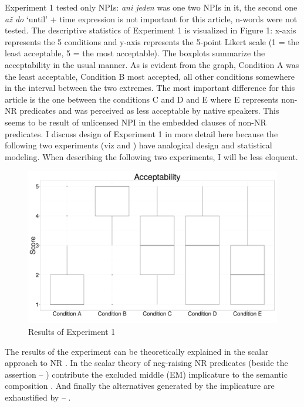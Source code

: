 \documentclass[output=paper,
]{langscibook}
\begin{document}
\noindent Experiment 1 tested only NPIs: \textit{ani jeden} was one two NPIs in it, the second one \textit{až do} `until' + time expression is not important for this article, n-words were not tested. The descriptive statistics of Experiment 1 is visualized in Figure 1: x-axis represents the 5 conditions and y-axis represents the 5-point Likert scale (1 = the least acceptable, 5 = the most acceptable). The boxplots summarize the acceptability in the usual manner. As is evident from the graph, Condition A was the least acceptable, Condition B most accepted, all other conditions somewhere in the interval between the two extremes. The most important difference for this article is the one between the conditions C and D and E where E represents non-NR predicates and was perceived as less acceptable by native speakers. This seems to be result of unlicensed NPI in the embedded clauses of non-NR predicates. I discuss design of Experiment 1 in more detail here because the following two experiments (viz  and ) have analogical design and statistical modeling. When describing the following two experiments, I will be less eloquent.

\begin{figure}
\centering
\includegraphics[scale=0.22]{figures/boxplot-exp1.png}
\caption{Results of Experiment 1}
\end{figure}


The results of the experiment can be theoretically explained in the scalar approach to NR \citep{horn1973semantic,romoli2012soft,romoli2013scalar}. In the scalar theory of neg-raising  NR predicates (beside the assertion -- ) contribute the  excluded middle (EM) implicature to the semantic composition . And finally the   alternatives generated by the implicature are exhaustified by  -- .
\end{document}
